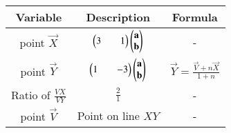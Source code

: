 \begin{tabular}[4pt]{| c| c| c|}
\hline
	\textbf{Variable} & \textbf{Description} & \textbf{Formula} \\
\hline
	point $\vec{X}$ & $\begin{pmatrix}3&&1\end{pmatrix}\begin{pmatrix}\mathbf{a} \\ \mathbf{b}\end{pmatrix}$ & - \\
\hline 
	point $\vec{Y}$ & $\begin{pmatrix}1&&-3\end{pmatrix}\begin{pmatrix}\mathbf{a} \\ \mathbf{b}\end{pmatrix}$ &  $\vec{Y} = \frac{\vec{V}+n\vec{X}}{1+n}$\\
\hline
	Ratio of $\frac{VX}{VY}$ & $\frac{2}{1}$ & - \\
\hline
	point $\vec{V}$ & Point on line $XY$ & - \\
\hline
\end{tabular}
